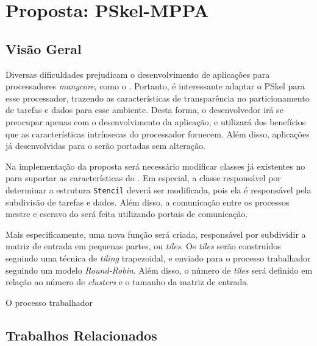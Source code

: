 \chapter{Proposta: PSkel-MPPA}

\section{Visão Geral}

Diversas dificuldades prejudicam o desenvolvimento de aplicações para
processadores \textit{manycore}, como o \mppa. Portanto, é interessante adaptar
o \fw PSkel para esse processador, trazendo as características de transparência
no particionamento de tarefas e dados para esse ambiente. Desta forma, o
desenvolvedor irá se preocupar apenas com o desenvolvimento da aplicação, e
utilizará dos benefícios que as características intrínsecas do processador
fornecem. Além disso, aplicações já desenvolvidas para o \fw serão portadas sem
alteração.


Na implementação da proposta será necessário modificar classes já existentes
no \fw para suportar as características do \mppa. Em especial, a classe
responsável por determinar a estrutura \texttt{Stencil} deverá ser modificada,
pois ela é responsável pela subdivisão de tarefas e dados.
Além disso, a comunicação entre os processos mestre e escravo do \mppa será
feita utilizando portais de comunicação.

Mais especificamente, uma nova função será criada, responsável por subdividir a matriz
de entrada em pequenas partes, ou \textit{tiles}.
Os \textit{tiles} serão construídos seguindo uma técnica de \textit{tiling}
trapezoidal, e enviado para o processo trabalhador seguindo um modelo \textit{Round-Robin}.
Além disso, o número de \textit{tiles} será definido em relação ao número de
\textit{clusters} e o tamanho da matriz de entrada.

O processo trabalhador



\section{Trabalhos Relacionados}

